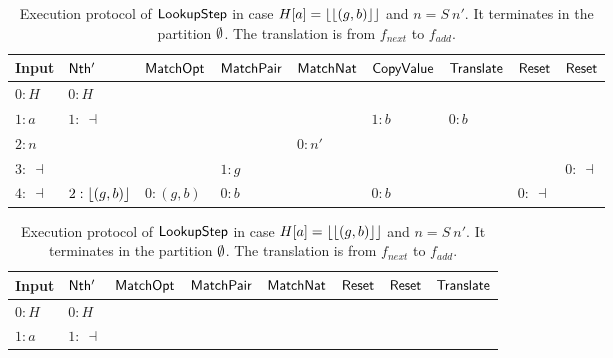 \begin{table}[t!]
  \scriptsize
  \begin{tabular}{l||l|l|l|l|l|l|l|l}
    Input       & $\mathsf{Nth'}$      & $\mathsf{MatchOpt}$       & $\mathsf{MatchPair}$     & $\mathsf{MatchNat}$ & $\mathsf{CopyValue}$  & $\mathsf{Translate}$ & $\mathsf{Reset}$ & $\mathsf{Reset}$ \\ \hline
    $0:H$       & $0:H$            &                       &                      &                 &                   &                  &              &              \\
    $1:a$       & $1:~\dashv$      &                       &                      &                 & $1:b$             & $0:b$            &              &              \\
    $2:n$       &                  &                       &                      & $0:n'$          &                   &                  &              &              \\
    $3:~\dashv$ &                  &                       & $1: g$               &                 &                   &                  &              & $0:~\dashv$  \\
    $4:~\dashv$ & $2:\left\lfloor {(g,b)} \right\rfloor$ & $0:(g,b)$             & $0:b$                &                 & $0:b$             &                  & $0:~\dashv$  &              \\
  \end{tabular}
  \caption{Execution protocol of $\mathsf{LookupStep}$ in case $H[a] = \left\lfloor {\left\lfloor {(g,b)} \right\rfloor} \right\rfloor$ and $n=S~n'$.  It terminates in the partition $\emptyset$.  The
    translation is from $f_{next}$ to $f_{add}$.}
  \label{tab:exec-LookupStep-S}
  \begin{tabular}{l||l|l|l|l|l|l|l}
    Input       & $\mathsf{Nth'}$      & $\mathsf{MatchOpt}$       & $\mathsf{MatchPair}$     & $\mathsf{MatchNat}$ & $\mathsf{Reset}$ & $\mathsf{Reset}$ & $\mathsf{Translate}$ \\ \hline
    $0:H$       & $0:H$            &                       &                      &                 &              &              &                  \\
    $1:a$       & $1:~\dashv$      &                       &                      &                 &              &              &                  \\

\end{tabular}
\end{table}
